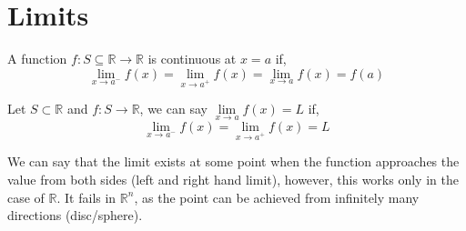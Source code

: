 	\section{Limits}
	\begin{theorem}[Continuity]
		A function $f: S \subseteq \mathbb{R} \to \mathbb{R}$ is continuous at $x=a$ if,
		\[\lim\limits_{x\to a^-}f(x)=\lim\limits_{x\to a^+}f(x)=\lim\limits_{x\to a}f(x)=f(a)\]
	\end{theorem}
	\begin{theorem}
		Let $S\subset \mathbb{R}$ and $f:S\to \mathbb{R}$, we can say $\lim\limits_{x\to a}f(x)=L$ if,
		\[\lim\limits_{x\to a^-}f(x)=\lim\limits_{x\to a^+}f(x)=L\]
	\end{theorem}
	We can say that the limit exists at some point when the function approaches the value from both sides (left and right hand limit), however, this works only in the case of $\mathbb{R}$. It fails in $\mathbb{R}^n$, as the point can be achieved from infinitely many directions (disc/sphere).
